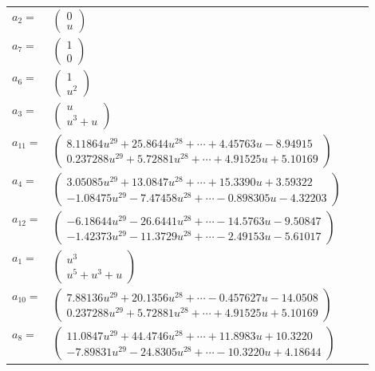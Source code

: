 \documentclass[1p]{elsarticle_modified}
\theoremstyle{definition}
\begin{document}
\begin{tabular}{m{7pt} m{180pt} m{7pt} m{180pt} }
\flushright $a_{2}=$&$\begin{pmatrix}0\\u\end{pmatrix}$ \\
\flushright $a_{7}=$&$\begin{pmatrix}1\\0\end{pmatrix}$ \\
\flushright $a_{6}=$&$\begin{pmatrix}1\\u^2\end{pmatrix}$ \\
\flushright $a_{3}=$&$\begin{pmatrix}u\\u^3+u\end{pmatrix}$ \\
\flushright $a_{11}=$&$\begin{pmatrix}8.11864 u^{29}+25.8644 u^{28}+\cdots+4.45763 u-8.94915\\0.237288 u^{29}+5.72881 u^{28}+\cdots+4.91525 u+5.10169\end{pmatrix}$ \\
\flushright $a_{4}=$&$\begin{pmatrix}3.05085 u^{29}+13.0847 u^{28}+\cdots+15.3390 u+3.59322\\-1.08475 u^{29}-7.47458 u^{28}+\cdots-0.898305 u-4.32203\end{pmatrix}$ \\
\flushright $a_{12}=$&$\begin{pmatrix}-6.18644 u^{29}-26.6441 u^{28}+\cdots-14.5763 u-9.50847\\-1.42373 u^{29}-11.3729 u^{28}+\cdots-2.49153 u-5.61017\end{pmatrix}$ \\
\flushright $a_{1}=$&$\begin{pmatrix}u^3\\u^5+u^3+u\end{pmatrix}$ \\
\flushright $a_{10}=$&$\begin{pmatrix}7.88136 u^{29}+20.1356 u^{28}+\cdots-0.457627 u-14.0508\\0.237288 u^{29}+5.72881 u^{28}+\cdots+4.91525 u+5.10169\end{pmatrix}$ \\
\flushright $a_{8}=$&$\begin{pmatrix}11.0847 u^{29}+44.4746 u^{28}+\cdots+11.8983 u+10.3220\\-7.89831 u^{29}-24.8305 u^{28}+\cdots-10.3220 u+4.18644\end{pmatrix}$ \\

\end{tabular}
\end{document}
